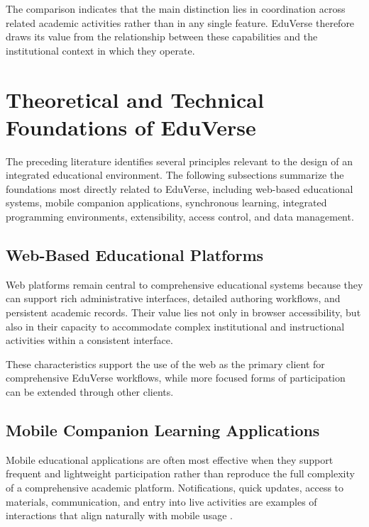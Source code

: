 The comparison indicates that the main distinction lies in coordination across
related academic activities rather than in any single feature. EduVerse
therefore draws its value from the relationship between these capabilities and
the institutional context in which they operate.

\section{Theoretical and Technical Foundations of EduVerse}
\label{sec:theoretical_technical_foundations_eduverse}

The preceding literature identifies several principles relevant to the design
of an integrated educational environment. The following subsections summarize
the foundations most directly related to EduVerse, including web-based
educational systems, mobile companion applications, synchronous learning,
integrated programming environments, extensibility, access control, and data
management.

\subsection{Web-Based Educational Platforms}
\label{subsec:web_based_educational_platforms}

Web platforms remain central to comprehensive educational systems because they
can support rich administrative interfaces, detailed authoring workflows, and
persistent academic records. Their value lies not only in browser accessibility,
but also in their capacity to accommodate complex institutional and
instructional activities within a consistent interface.

These characteristics support the use of the web as the primary client for
comprehensive EduVerse workflows, while more focused forms of participation can
be extended through other clients.

\subsection{Mobile Companion Learning Applications}
\label{subsec:mobile_companion_learning_applications}

Mobile educational applications are often most effective when they support
frequent and lightweight participation rather than reproduce the full
complexity of a comprehensive academic platform. Notifications, quick updates,
access to materials, communication, and entry into live activities are examples
of interactions that align naturally with mobile usage
\cite{rangel2023mobile}.

